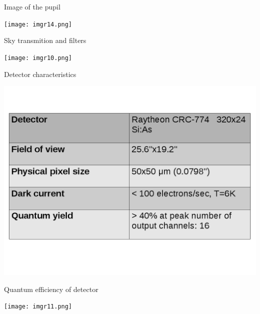 \documentclass{beamer}
\begin{document}
\begin{frame}{Image of the pupil}
\begin{center}
\texttt{[image: imgr14.png]}
\end{center}
\end{frame}

\begin{frame}{Sky transmition and filters}
\begin{center}
\texttt{[image: imgr10.png]}
\end{center}
\end{frame}


\begin{frame}{Detector characteristics}
\begin{center}
\includegraphics[scale=0.35]{imgr7.png}
\end{center}
\end{frame}

\begin{frame}{Quantum efficiency of detector}
\begin{center}
\texttt{[image: imgr11.png]}
\end{center}
\end{frame}
\end{document}
